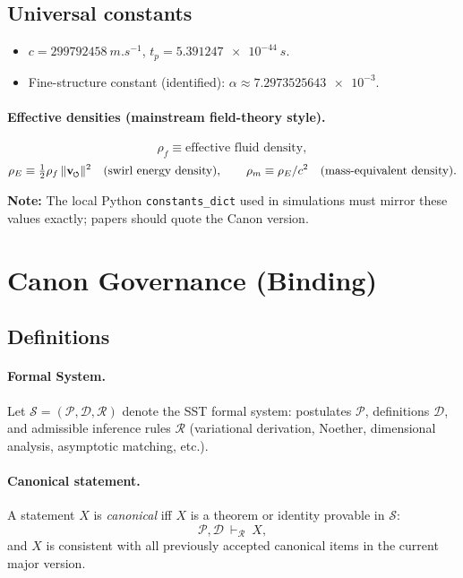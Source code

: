 \documentclass[11pt]{article}
\begin{document}
    \subsection*{Universal constants}
    \begin{itemize}
        \item $c=\num{299792458}\ \si{m.s^{-1}}$, \quad $t_p=\num{5.391247e-44}\ \si{s}$.
        \item Fine-structure constant (identified): $\alpha \approx \num{7.2973525643e-3}$.
    \end{itemize}

    \paragraph{Effective densities (mainstream field-theory style).}
    \[
        \rho_f \equiv \text{effective fluid density},
	\]
	\[
        \rho_E \equiv \tfrac12 \rho_f\, \vnorm^2\quad(\text{swirl energy density}),\qquad
        \rho_m \equiv \rho_E/c^2\quad(\text{mass-equivalent density}).
    \]

    \textbf{Note:} The local Python \texttt{constants\_dict} used in simulations must mirror these values exactly; papers should quote the Canon version.


    \section*{Canon Governance (Binding)}

    \subsection*{Definitions}
    \paragraph{Formal System.}
    Let \(\mathcal{S} = (\mathcal{P},\mathcal{D},\mathcal{R})\) denote the SST formal system:
    postulates \(\mathcal{P}\), definitions \(\mathcal{D}\), and admissible inference rules \(\mathcal{R}\)
    (variational derivation, Noether, dimensional analysis, asymptotic matching, etc.).

    \paragraph{Canonical statement.}
    A statement \(X\) is \emph{canonical} iff \(X\) is a theorem or identity provable in \(\mathcal{S}\):
    \[
        \mathcal{P},\mathcal{D}\ \vdash_{\mathcal{R}}\ X,
    \]
    and \(X\) is consistent with all previously accepted canonical items in the current major version.
\end{document}
